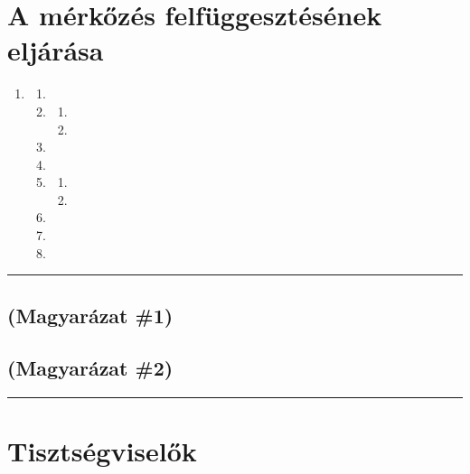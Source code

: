 \documentclass[]{report}
\newenvironment{expl}[0]%
  {\rule{\textwidth}{.2pt}\footnotesize}%
  {\rule{\textwidth}{.2pt}\normalsize}
\begin{document}
\chapter{A mérkőzés felfüggesztésének eljárása}

\begin{enumerate}
\item

    \begin{enumerate}
    \item
    
    \item
    
        \begin{enumerate}
        \item
        
        \item
        
        \end{enumerate}
    \item
    
    \item
    
    \item
    
        \begin{enumerate}
        \item
        
        \item
        
        \end{enumerate}
    \item
    
    \item
    
    \item
    
    \end{enumerate}
\end{enumerate}

\begin{expl}
\section*{(Magyarázat \#1)}

\section*{(Magyarázat \#2)}

\end{expl}


\chapter{Tisztségviselők}
\end{document}
